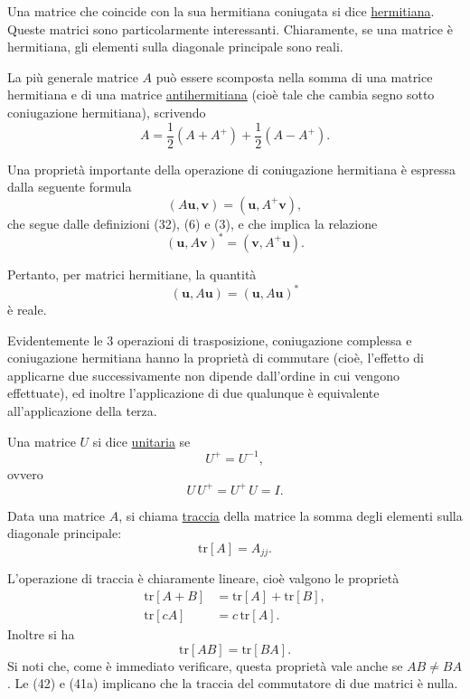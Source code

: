 \documentclass[11pt, a4paper]{book}
\numberwithin{equation}{section}
\begin{document}
Una matrice che coincide con la sua hermitiana coniugata si dice \underline{hermitiana}. Queste matrici sono particolarmente interessanti. Chiaramente, se una matrice è hermitiana, gli elementi sulla diagonale principale sono reali.

La più generale matrice $A$ può essere scomposta nella somma di una matrice hermitiana e di una matrice \underline{antihermitiana} (cioè tale che cambia segno sotto coniugazione hermitiana), scrivendo
\[
    A = \frac{1}{2}\left(A + A^+\right) + \frac{1}{2}\left(A - A^+\right).
\]

Una proprietà importante della operazione di coniugazione hermitiana è espressa dalla seguente formula
\begin{equation}
    (A\mathbf{u}, \mathbf{v}) = (\mathbf{u}, A^+\mathbf{v}),
    \tag{37}
\end{equation}
che segue dalle definizioni (32), (6) e (3), e che implica la relazione
\begin{equation}
    (\mathbf{u}, A\mathbf{v})^* = (\mathbf{v}, A^+\mathbf{u}).
    \tag{38a}
\end{equation}

Pertanto, per matrici hermitiane, la quantità
\begin{equation}
    (\mathbf{u}, A\mathbf{u}) = (\mathbf{u}, A\mathbf{u})^*
    \tag{38b}
\end{equation}
è reale.

Evidentemente le 3 operazioni di trasposizione, coniugazione complessa e coniugazione hermitiana hanno la proprietà di commutare (cioè, l'effetto di applicarne due successivamente non dipende dall'ordine in cui vengono effettuate), ed inoltre l'applicazione di due qualunque è equivalente all'applicazione della terza.

Una matrice $U$ si dice \underline{unitaria} se
\begin{equation}
    U^+ = U^{-1},
    \tag{39a}
\end{equation}
ovvero
\begin{equation}
    U\,U^+ = U^+\, U = I.
    \tag{39b}
\end{equation}

Data una matrice $A$, si chiama \underline{traccia} della matrice la somma degli elementi sulla diagonale principale:
\begin{equation}
    \mathrm{tr}[A] = A_{jj}.
    \tag{40}
\end{equation}

L'operazione di traccia è chiaramente lineare, cioè valgono le proprietà
\begin{align}
    \mathrm{tr}[A + B] &= \mathrm{tr}[A] + \mathrm{tr}[B],
    \tag{41a} \\
    \mathrm{tr}[c A] &= c\, \mathrm{tr}[A].
    \tag{41b}
\end{align}
Inoltre si ha
\begin{equation}
    \mathrm{tr}[AB] = \mathrm{tr}[BA].
    \tag{42}
\end{equation}
Si noti che, come è immediato verificare, questa proprietà vale anche se $AB \neq BA$. Le (42) e (41a) implicano che la traccia del commutatore di due matrici è nulla.
\end{document}
